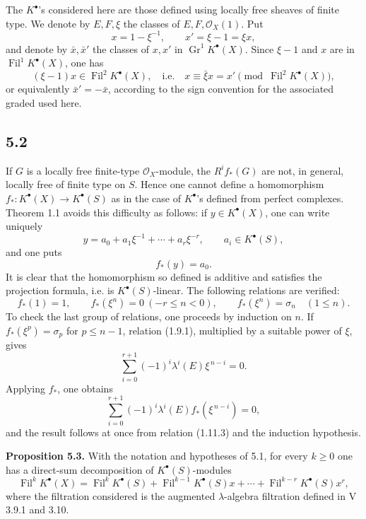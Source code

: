 \documentclass[11pt]{article}
\newcommand{\Fil}{\operatorname{Fil}}
\begin{document}
The \(K^\bullet\)'s considered here are those defined using locally free sheaves of finite type. We denote by \(E,F,\xi\) the classes of \(E,F,\mathcal O_X(1)\). Put
\[
  x=1-\xi^{-1},\qquad x'=\xi-1=\xi x,
\]
and denote by \(\bar x,\bar x'\) the classes of \(x,x'\) in \(\operatorname{Gr}^1K^\bullet(X)\). Since \(\xi-1\) and \(x\) are in \(\Fil^1K^\bullet(X)\), one has
\[
  (\xi-1)x\in \Fil^2K^\bullet(X),
  \quad\text{i.e.}\quad x\equiv \bar\xi x=x'\pmod{\Fil^2K^\bullet(X)},
\]
or equivalently \(\bar x'=-\bar x\), according to the sign convention for the associated graded used here.

\subsection*{5.2}
If \(G\) is a locally free finite-type \(\mathcal O_X\)-module, the \(R^if_*(G)\) are not, in general, locally free of finite type on \(S\). Hence one cannot define a homomorphism \(f_*:K^\bullet(X)\to K^\bullet(S)\) as in the case of \(K^\bullet\)'s defined from perfect complexes. Theorem 1.1 avoids this difficulty as follows: if \(y\in K^\bullet(X)\), one can write uniquely
\begin{equation}\tag{5.2.1}
  y=a_0+a_1\xi^{-1}+\cdots+a_r\xi^{-r},
  \qquad a_i\in K^\bullet(S),
\end{equation}
and one puts
\begin{equation}\tag{5.2.2}
  f_*(y)=a_0 .
\end{equation}
It is clear that the homomorphism so defined is additive and satisfies the projection formula, i.e. is \(K^\bullet(S)\)-linear. The following relations are verified:
\begin{equation}\tag{5.2.3}
 f_*(1)=1,\qquad f_*(\xi^n)=0\ (-r\leq n<0),\qquad
 f_*(\xi^n)=\sigma_n\quad (1\leq n).
\end{equation}
To check the last group of relations, one proceeds by induction on \(n\). If \(f_*(\xi^p)=\sigma_p\) for \(p\leq n-1\), relation (1.9.1), multiplied by a suitable power of \(\xi\), gives
\[
  \sum_{i=0}^{r+1}(-1)^i\lambda^i(E)\xi^{\,n-i}=0.
\]
Applying \(f_*\), one obtains
\[
  \sum_{i=0}^{r+1}(-1)^i\lambda^i(E)f_*(\xi^{\,n-i})=0,
\]
and the result follows at once from relation (1.11.3) and the induction hypothesis.

\textbf{Proposition 5.3.} With the notation and hypotheses of 5.1, for every \(k\geq0\) one has a direct-sum decomposition of \(K^\bullet(S)\)-modules
\[
  \Fil^kK^\bullet(X)=
  \Fil^kK^\bullet(S)+\Fil^{k-1}K^\bullet(S)x+\cdots+
  \Fil^{k-r}K^\bullet(S)x^r,
\]
where the filtration considered is the augmented \(\lambda\)-algebra filtration defined in V 3.9.1 and 3.10.
\end{document}
